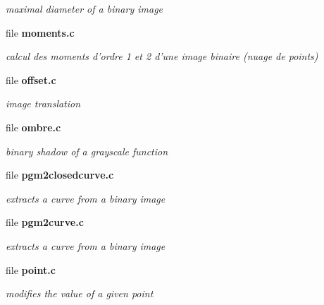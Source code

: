 \begin{DoxyCompactItemize}
\begin{DoxyCompactList}\small\item\em maximal diameter of a binary image \item\end{DoxyCompactList}

\item 
file {\bf moments.c}


\begin{DoxyCompactList}\small\item\em calcul des moments d'ordre 1 et 2 d'une image binaire (nuage de points) \item\end{DoxyCompactList}

\item 
file {\bf offset.c}


\begin{DoxyCompactList}\small\item\em image translation \item\end{DoxyCompactList}

\item 
file {\bf ombre.c}


\begin{DoxyCompactList}\small\item\em binary shadow of a grayscale function \item\end{DoxyCompactList}

\item 
file {\bf pgm2closedcurve.c}


\begin{DoxyCompactList}\small\item\em extracts a curve from a binary image \item\end{DoxyCompactList}

\item 
file {\bf pgm2curve.c}


\begin{DoxyCompactList}\small\item\em extracts a curve from a binary image \item\end{DoxyCompactList}

\item 
file {\bf point.c}


\begin{DoxyCompactList}\small\item\em modifies the value of a given point \item\end{DoxyCompactList}


\end{DoxyCompactItemize}
